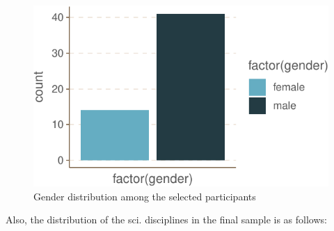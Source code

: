 \documentclass[]{tufte-book}
\begin{document}
\begin{figure}
    
\includegraphics{SIVOCS_int-cand_files/figure-latex/gender-1}
\caption{Gender distribution among the selected participants}
\label{fig:gender}
\end{figure}

Also, the distribution of the sci. disciplines in the final sample is as
follows:
\end{document}
